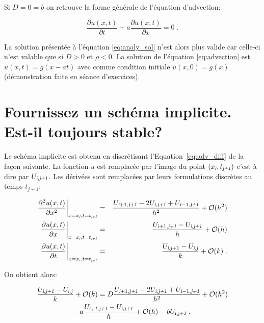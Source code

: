 \documentclass[a4paper, 12pt]{report}
\begin{document}
Si $D=0=b$ on retrouve la forme générale de l'équation d'advection:

\begin{equation}
  \frac{\partial u(x,t)}{\partial t} + a \frac{\partial u(x,t)}{\partial x} = 0 \;.
  \label{eq:advection}
\end{equation}

La solution présentée à l'équation \eqref{eq:analy_sol} n'est alors plus valide
car celle-ci n'est valable que si $D>0$ et $\rho < 0$. La solution de
l'équation \eqref{eq:advection} est $u(x,t) = g(x-at)$ avec comme condition
initiale $u(x,0) = g(x)$ (démonstration faite en séance d'exercices).


\section{Fournissez un schéma implicite. Est-il toujours stable?}
\label{sec:implicite}

Le schéma implicite est obtenu en discrétisant l'Equation~\ref{eq:adv_diff}
de la façon suivante. La fonction $u$ est remplacée par l'image du point $(x_{\textsl{i}},t_{\textsl{j+1}})$
c'est à dire par $U_{\textsl{i},\textsl{j+1}}$. Les dérivées sont remplacées par leurs formulations discrètes
au temps $t_{j+1}$:

\begin{align}
  \frac{\partial^2 u (x,t)}{\partial x^2} \biggr |_{x=x_{\textsl{i}}, t=t_{\textsl{j+1}}} &=& \frac{U_{\textsl{i}+1,\textsl{j+1}} - 2 U_{\textsl{i},\textsl{j+1}} + U_{\textsl{i}-1,\textsl{j+1}}}{h^2} + \mathcal{O}(h^2)\\
  \frac{\partial u (x,t)}{\partial x} \biggr |_{x=x_{\textsl{i}}, t=t_{\textsl{j+1}}} &=& \frac{U_{\textsl{i}+1,\textsl{j+1}} - U_{\textsl{i},\textsl{j+1}}}{h} + \mathcal{O}(h)\\
  \frac{\partial u (x,t)}{\partial t} \biggr |_{x=x_{\textsl{i}}, t=t_{\textsl{j+1}}} &=& \frac{U_{\textsl{i},\textsl{j}+1} - U_{\textsl{i},\textsl{j}}}{k} + \mathcal{O}(k) \;.
\end{align}

On obtient alors:

\begin{multline}
\frac{U_{\textsl{i},\textsl{j+1}} - U_{\textsl{i},\textsl{j}}}{k} + \mathcal{O}(k)  = D \frac{U_{\textsl{i}+1,\textsl{j+1}} - 2 U_{\textsl{i},\textsl{j+1}} + U_{\textsl{i}-1,\textsl{j+1}}}{h^2}+ \mathcal{O}(h^2) \\
- a \frac{U_{\textsl{i+1},\textsl{j+1}} - U_{\textsl{i},\textsl{j+1}}}{h} + \mathcal{O}(h) - b U_{\textsl{i},\textsl{j+1}}\;.
\end{multline}
\end{document}
